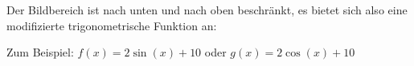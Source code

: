 \item  Der Bildbereich ist nach unten und nach oben beschränkt, es bietet sich also eine modifizierte trigonometrische Funktion an:

Zum Beispiel: $f(x) = 2\sin(x) +10$ oder $g(x) = 2\cos(x) +10$


